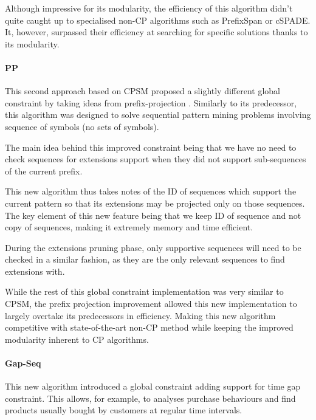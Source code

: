 \documentclass{eplmastersthesis}
\begin{document}
Although impressive for its modularity, the efficiency of this algorithm didn't quite caught up to specialised non-CP algorithms such as PrefixSpan or cSPADE. It, however, surpassed their efficiency at searching for specific solutions thanks to its modularity.

\paragraph{PP}

This second approach based on CPSM proposed a slightly different global constraint by taking ideas from prefix-projection \cite{kemmar2015prefix}. Similarly to its predecessor, this algorithm was designed to solve sequential pattern mining problems involving sequence of symbols (no sets of symbols).\newline

The main idea behind this improved constraint being that we have no need to check sequences for extensions support when they did not support sub-sequences of the current prefix. \newline

This new algorithm thus takes notes of the ID of sequences which support the current pattern so that its extensions may be projected only on those sequences. The key element of this new feature being that we keep ID of sequence and not copy of sequences, making it extremely memory and time efficient. \newline

During the extensions pruning phase, only supportive sequences will need to be checked in a similar fashion, as they are the only relevant sequences to find extensions with. \newline

While the rest of this global constraint implementation was very similar to CPSM, the prefix projection improvement allowed this new implementation to largely overtake its predecessors in efficiency. Making this new algorithm competitive with state-of-the-art non-CP method while keeping the improved modularity inherent to CP algorithms.

\paragraph{Gap-Seq}

This new algorithm introduced a global constraint adding support for time gap constraint. This allows, for example, to analyses purchase behaviours and find products usually bought by customers at regular time intervals. \newline
\end{document}
